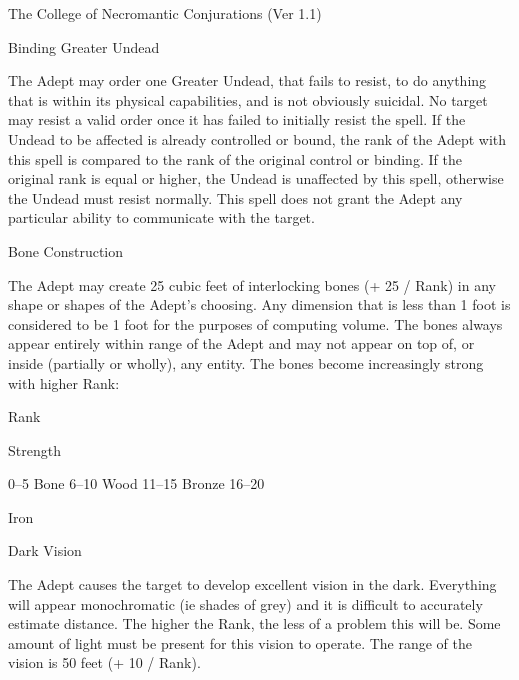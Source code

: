 \begin{Chapter}{The College of Necromantic Conjurations (Ver 1.1)}
\begin{spell}[S-3]{Binding Greater Undead}

\begin{effects}
The Adept may order one Greater Undead, that fails to resist, to do
anything that is within its physical capabilities, and is not
obviously suicidal.  No target may resist a valid order once it has
failed to initially resist the spell.  If the Undead to be affected is
already controlled or bound, the rank of the Adept with this spell is
compared to the rank of the original control or binding. If the
original rank is equal or higher, the Undead is unaffected by this
spell, otherwise the Undead must resist normally.  This spell does not
grant the Adept any particular ability to communicate with the target.
\end{effects}
\end{spell}

\begin{spell}[S-4]{Bone Construction}

\begin{effects}
The Adept may create 25 cubic feet of interlocking bones (+ 25 / Rank)
in any shape or shapes of the Adept’s choosing.  Any dimension that is
less than 1 foot is considered to be 1 foot for the purposes of
computing volume.  The bones always appear entirely within range of
the Adept and may not appear on top of, or inside (partially or
wholly), any entity. The bones become increasingly strong with higher
Rank:

Rank 

Strength 

0–5 
Bone 
6–10  Wood 
11–15  Bronze 
16–20 

Iron 

\end{effects}
\end{spell}

\begin{spell}[S-5]{Dark Vision}

\begin{effects}
The Adept causes the target to develop excellent vision in the
dark. Everything will appear monochromatic (ie shades of grey) and it
is difficult to accurately estimate distance. The higher the Rank, the
less of a problem this will be.  Some amount of light must be present
for this vision to operate.  The range of the vision is 50 feet (+ 10
/ Rank).
\end{effects}
\end{spell}


\end{Chapter}
